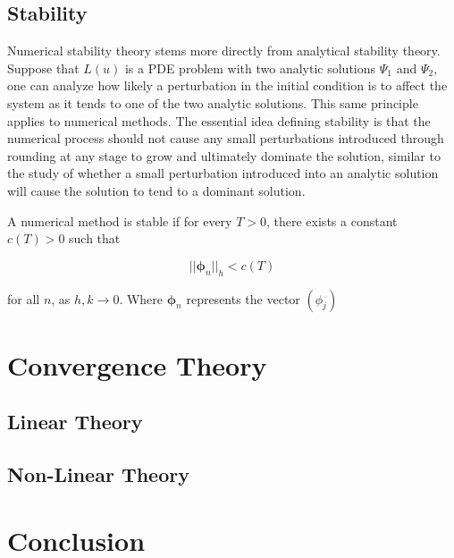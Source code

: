 \documentclass[../main.tex]{subfiles}
\begin{document}
  \subsection{Stability}
  Numerical stability theory stems more directly from analytical stability theory. Suppose that $L(u)$ is a PDE problem with two analytic solutions $\Psi_1$ and $\Psi_2$, one can analyze how likely a perturbation in the initial condition is to affect the system as it tends to one of the two analytic solutions. This same principle applies to numerical methods. The essential idea defining stability is that the numerical process should not cause any small perturbations introduced through rounding at any stage to grow and ultimately dominate the solution, similar to the study of whether a small perturbation introduced into an analytic solution will cause the solution to tend to a dominant solution.

  \begin{definition}
    A numerical method is stable if for every $T > 0$, there exists a constant $c(T) > 0$ such that

    \begin{equation}
      || \boldsymbol\phi_n ||_h < c(T)
    \end{equation}

    for all $n$, as $h, k \to 0$. Where $\boldsymbol\phi_n$ represents the vector $( \phi_j )$
  \end{definition}



  \section{Convergence Theory}

  \subsection{Linear Theory}

  \subsection{Non-Linear Theory}

  \section{Conclusion}
\end{document}
